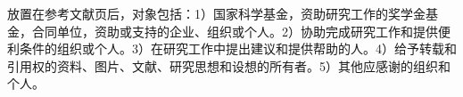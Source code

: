 \setlength{\baselineskip}{20pt}

\begin{thanks}
放置在参考文献页后，对象包括：1）国家科学基金，资助研究工作的奖学金基金，合同单位，资助或支持的企业、组织或个人。2）协助完成研究工作和提供便利条件的组织或个人。3）在研究工作中提出建议和提供帮助的人。4）给予转载和引用权的资料、图片、文献、研究思想和设想的所有者。5）其他应感谢的组织和个人。
\end{thanks}